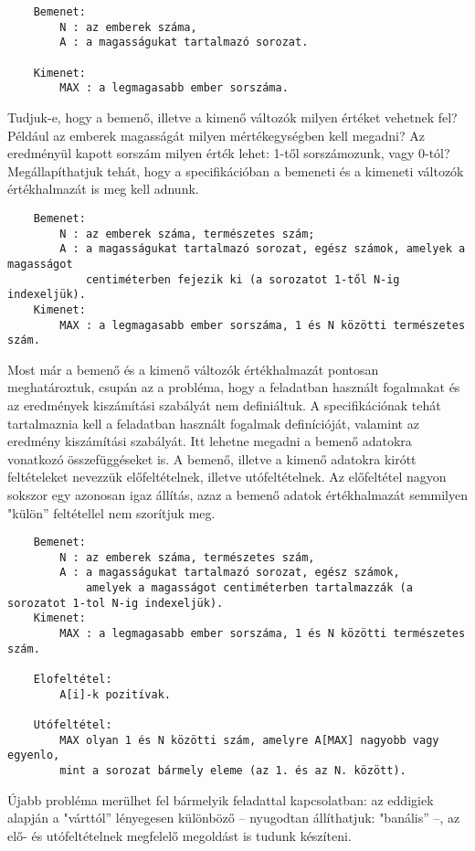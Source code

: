 \documentclass[margin=0px]{article}
\begin{document}
	\begin{verbatim}
	Bemenet: 
	    N : az emberek száma,
	    A : a magasságukat tartalmazó sorozat.
	
	Kimenet:
	    MAX : a legmagasabb ember sorszáma.
	\end{verbatim}

	
	Tudjuk-e, hogy a bemenő, illetve a kimenő változók milyen értéket vehetnek fel? Például az emberek magasságát milyen mértékegységben kell megadni? Az eredményül kapott sorszám milyen érték lehet: 1-től sorszámozunk, vagy 0-tól? Megállapíthatjuk tehát, hogy a specifikációban a bemeneti és a kimeneti változók értékhalmazát is meg kell adnunk.
	
	\begin{verbatim}
	Bemenet:
	    N : az emberek száma, természetes szám;
	    A : a magasságukat tartalmazó sorozat, egész számok, amelyek a magasságot
	        centiméterben fejezik ki (a sorozatot 1-től N-ig indexeljük).
	Kimenet: 
	    MAX : a legmagasabb ember sorszáma, 1 és N közötti természetes szám.
	\end{verbatim}
	
	Most már a bemenő és a kimenő változók értékhalmazát pontosan meghatároztuk, csupán az a probléma, hogy a feladatban használt fogalmakat és az eredmények kiszámítási szabályát nem definiáltuk. A specifikációnak tehát tartalmaznia kell a feladatban használt fogalmak definícióját, valamint az eredmény kiszámítási szabályát. Itt lehetne megadni a bemenő adatokra vonatkozó összefüggéseket is. A bemenő, illetve a kimenő adatokra kirótt feltételeket nevezzük előfeltételnek, illetve utófeltételnek. Az előfeltétel nagyon sokszor egy azonosan igaz állítás, azaz a bemenő adatok értékhalmazát semmilyen "külön” feltétellel nem szorítjuk meg.
	
	\begin{verbatim}
	Bemenet: 
     	N : az emberek száma, természetes szám,
     	A : a magasságukat tartalmazó sorozat, egész számok, 
        	amelyek a magasságot centiméterben tartalmazzák (a sorozatot 1-tol N-ig indexeljük).
	Kimenet:	
     	MAX : a legmagasabb ember sorszáma, 1 és N közötti természetes szám.
	
	Elofeltétel: 
    	A[i]-k pozitívak.
	
	Utófeltétel: 	
	    MAX olyan 1 és N közötti szám, amelyre A[MAX] nagyobb vagy egyenlo, 	
	    mint a sorozat bármely eleme (az 1. és az N. között).
	\end{verbatim}
	
	Újabb probléma merülhet fel bármelyik feladattal kapcsolatban: az eddigiek alapján a "várttól” lényegesen különböző – nyugodtan állíthatjuk: "banális” –, az elő- és utófeltételnek megfelelő megoldást is tudunk készíteni. 
	
\end{document}
